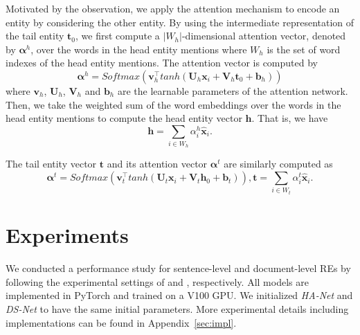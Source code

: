 \documentclass[11pt]{article}
\newcommand{\hanet}{\emph{HA-Net}\xspace}
\newcommand{\dsnet}{\emph{DS-Net}\xspace}
\newcommand{\vect}[1]{\boldsymbol{\mathbf{#1}}}
\begin{document}
Motivated by the observation, we apply the attention mechanism \cite{bahdanau2015neural} to encode an entity by considering the other entity.
By using the intermediate representation of the tail entity $\vect{t}_0$, we first compute a $|W_h|$-dimensional attention vector, denoted by $\vect{\alpha}^h$, over the words in the head entity mentions where $W_h$ is the set of word indexes of the head entity mentions.
The attention vector is computed by
\begin{equation*}
\vect{\alpha}^h = Softmax(\vect{v}_h^\top tanh(\vect{U}_h \vect{x}_i + \vect{V}_h\vect{t}_0 + \vect{b}_h))
\end{equation*}
where $\vect{v}_h$, $\vect{U}_h$, $\vect{V}_h$ and $\vect{b}_h$ are the learnable parameters of the attention network.
Then, we take the weighted sum of the word embeddings over the words in the head entity mentions to compute the head entity vector $\vect{h}$.
That is, we have
\begin{equation*}
\vect{h} = \sum_{i \in W_h}{\alpha_i^h \hat{\vect{x}}_i}.
\end{equation*}



The tail entity vector  $\vect{t}$ and its  attention vector $\vect{\alpha}^t$ are similarly computed as
\begin{equation*}
\vect{\alpha}^t = Softmax(\vect{v}_t^\top tanh(\vect{U}_t \vect{x}_i + \vect{V}_t\vect{h}_0 + \vect{b}_t)), \vect{t} = \sum_{i \in W_t}{\alpha^t_i \hat{\vect{x}}_i}.
\end{equation*}














\iffalse
\subsection{A common structure of the modules}

\begin{figure}[tb]
	\texttt{[image: common\_module]}
	\caption{A common structure of the modules of our proposed model \label{fig:common_module}}
\end{figure}
\fi


 \section{Experiments}
We conducted a performance study for sentence-level and document-level REs by following the experimental settings of \cite{ye2019looking} and \cite{yao2019docred,wang2019fine}, respectively.
All models are implemented in PyTorch and trained on a V100 GPU.
We initialized \hanet and \dsnet to have the same initial parameters.
More experimental details including implementations can be found in Appendix~\ref{sec:impl}.
\end{document}
